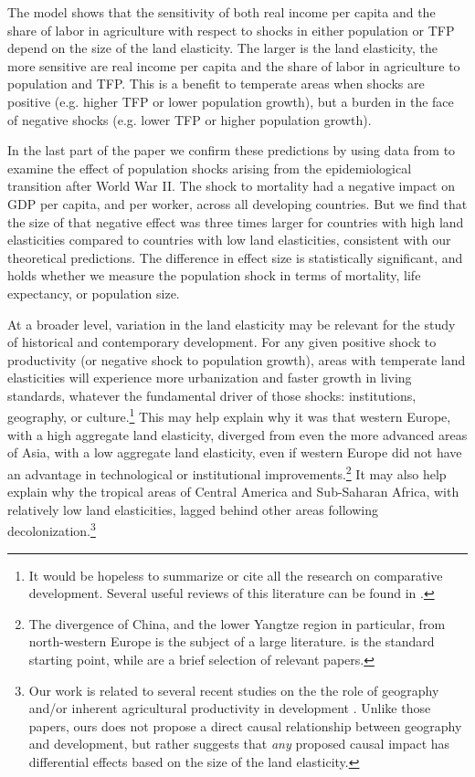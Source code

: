 \documentclass[11pt]{article}
\begin{document}
The model shows that the sensitivity of both real income per capita and the share of labor in agriculture with respect to shocks in either population or TFP depend on the size of the land elasticity. The larger is the land elasticity, the more sensitive are real income per capita and the share of labor in agriculture to population and TFP. This is a benefit to temperate areas when shocks are positive (e.g. higher TFP or lower population growth), but a burden in the face of negative shocks (e.g. lower TFP or higher population growth).

In the last part of the paper we confirm these predictions by using data from \cite{aj07} to examine the effect of population shocks arising from the epidemiological transition after World War II. The shock to mortality had a negative impact on GDP per capita, and per worker, across all developing countries. But we find that the size of that negative effect was three times larger for countries with high land elasticities compared to countries with low land elasticities, consistent with our theoretical predictions. The difference in effect size is statistically significant, and holds whether we measure the population shock in terms of mortality, life expectancy, or population size.

At a broader level, variation in the land elasticity may be relevant for the study of historical and contemporary development. For any given positive shock to productivity (or negative shock to population growth), areas with temperate land elasticities will experience more urbanization and faster growth in living standards, whatever the fundamental driver of those shocks: institutions, geography, or culture.\footnote{It would be hopeless to summarize or cite all the research on comparative development. Several useful reviews of this literature can be found in \cite{ajr2005handbook,nunn_2009,Galor:2011uq,sw2013,vries2013}.} This may help explain why it was that western Europe, with a high aggregate land elasticity, diverged from even the more advanced areas of Asia, with a low aggregate land elasticity, even if western Europe did not have an advantage in technological or institutional improvements.\footnote{The divergence of China, and the lower Yangtze region in particular, from north-western Europe is the subject of a large literature. \citet{pom2000} is the standard starting point, while \citet{allen11,huang2002,ma2013,lee2002,bg2006} are a brief selection of relevant papers.} It may also help explain why the tropical areas of Central America and Sub-Saharan Africa, with relatively low land elasticities, lagged behind other areas following decolonization.\footnote{Our work is related to several recent studies on the the role of geography and/or inherent agricultural productivity in development \citep{oh2005,ashraf2010dynamics,Nunn2011,Nunn2012,mich2012,agn2013,cook14,cook2014role,fenske2014,alsan2015,ashrafmich2015,dks2015,galorozak2016,litina2016,ads2016,FrankemaPap2017}. Unlike those papers, ours does not propose a direct causal relationship between geography and development, but rather suggests that \textit{any} proposed causal impact has differential effects based on the size of the land elasticity.} 
\end{document}
